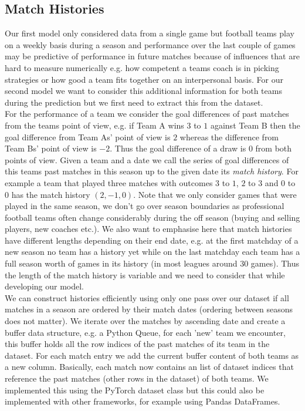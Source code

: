 \documentclass[a4paper]{article}
\begin{document}
\subsection{Match Histories}
Our first model only considered data from a single game but football teams play
on a weekly basis during a season and performance over the last couple of games
may be predictive of performance in future matches because of influences that
are hard to measure numerically e.g. how competent a teams coach is in picking
strategies or how good a team fits together on an interpersonal basis. For our
second model we want to consider this additional information for both teams
during the prediction but we first need to extract this from the dataset. \\
For the performance of a team we consider the goal differences of past matches
from the teams point of view, e.g. if Team A wins $3$ to $1$ against Team B then
the goal difference from Team As' point of view is $2$ whereas the difference
from Team Bs' point of view is $-2$. Thus the goal difference of a draw is $0$ from both points of view. Given a team and a date we call the series of goal differences
of this teams past matches in this season up to the given date its \textit{match
history}. For example a team that played three matches with outcomes $3$ to $1$,
$2$ to $3$ and $0$ to $0$ has the match history $(2, -1, 0)$. Note that we only
consider games that were played in the same season, we don't go over season
boundaries as professional football teams often change considerably during the
off season (buying and selling players, new coaches etc.). We also want to
emphasise here that match histories have different lengths depending on their
end date, e.g. at the first matchday of a new season no team has a history yet
while on the last matchday each team has a full season worth of games in its
history (in most leagues around $30$ games). Thus the length of the match
history is variable and we need to consider that while
developing our model. \\
We can construct histories efficiently using only one pass over our
dataset if all matches in a season are ordered by their match dates (ordering
between seasons does not matter). We iterate over the matches by ascending date
and create a buffer data structure, e.g. a Python Queue, for each 'new' team we
encounter, this buffer holds all the row indices of the past matches of its team
in the dataset. For each match entry we add the current buffer content of both
teams as a new column. Basically, each match now contains an list of dataset
indices that reference the past matches (other rows in the dataset) of both
teams. We implemented this using the PyTorch dataset class but this could also
be implemented with other frameworks, for example using Pandas DataFrames.
\end{document}
